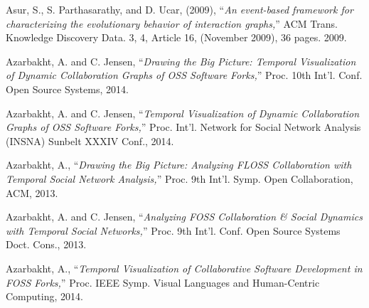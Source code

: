 %
%
%
% 
% 
%
\begin{thebibliography}{99.}
%
%
%
%
%
%
%
%
 Asur, S., S. Parthasarathy, and D. Ucar, (2009), ``\textit{An event-based framework for characterizing the evolutionary behavior of interaction graphs,}'' ACM Trans.  Knowledge Discovery Data. 3, 4, Article 16, (November 2009), 36 pages. 2009.

 Azarbakht, A. and C. Jensen, ``\textit{Drawing the Big Picture: Temporal Visualization of Dynamic Collaboration Graphs of OSS Software Forks,}'' Proc. 10th Int'l. Conf. Open Source Systems, 2014.

 Azarbakht, A. and C. Jensen, ``\textit{Temporal Visualization of Dynamic Collaboration Graphs of OSS Software Forks,}'' Proc. Int'l. Network for Social Network Analysis (INSNA) Sunbelt XXXIV Conf., 2014.

 Azarbakht, A., ``\textit{Drawing the Big Picture: Analyzing FLOSS Collaboration with Temporal Social Network Analysis,}'' Proc. 9th Int'l. Symp. Open Collaboration, ACM, 2013.

 Azarbakht, A. and C. Jensen, ``\textit{Analyzing FOSS Collaboration \& Social Dynamics with Temporal Social Networks,}'' Proc. 9th Int'l. Conf. Open Source Systems Doct. Cons., 2013.

 Azarbakht, A., ``\textit{Temporal Visualization of Collaborative Software Development in FOSS Forks,}'' Proc. IEEE Symp. Visual Languages and Human-Centric Computing, 2014.


\end{thebibliography}
